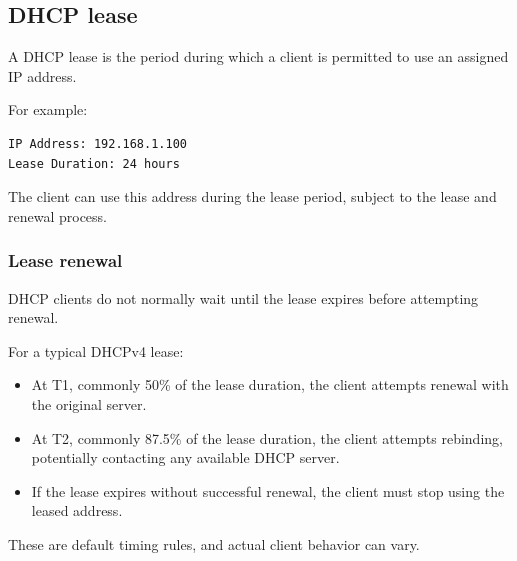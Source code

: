 \subsection{DHCP lease}

A DHCP lease is the period during which a client is permitted to use an assigned IP address.

For example:

\begin{lstlisting}
IP Address: 192.168.1.100
Lease Duration: 24 hours
\end{lstlisting}

The client can use this address during the lease period, subject to the lease and renewal process.

\subsubsection{Lease renewal}

DHCP clients do not normally wait until the lease expires before attempting renewal.

For a typical DHCPv4 lease:

\begin{itemize}
\item At T1, commonly 50\% of the lease duration, the client attempts renewal with the original server.
\item At T2, commonly 87.5\% of the lease duration, the client attempts rebinding, potentially contacting any available DHCP server.
\item If the lease expires without successful renewal, the client must stop using the leased address.
\end{itemize}

These are default timing rules, and actual client behavior can vary.

